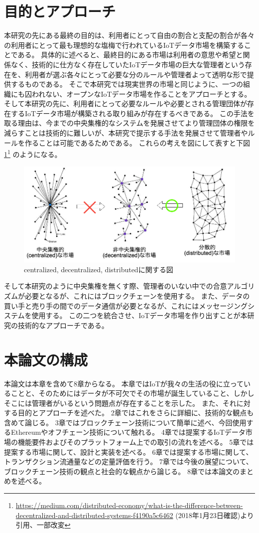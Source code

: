 \section{目的とアプローチ}
本研究の先にある最終の目的は、利用者にとって自由の割合と支配の割合が各々の利用者にとって最も理想的な塩梅で行われているIoTデータ市場を構築することである。
具体的に述べると、最終目的にある市場は利用者の意思や希望と関係なく、技術的に仕方なく存在していたIoTデータ市場の巨大な管理者という存在を、利用者が選ぶ各々にとって必要な分のルールや管理者よって透明な形で提供するものである。
そこで本研究では現実世界の市場と同じように、一つの組織にも囚われない、オープンなIoTデータ市場を作ることをアプローチとする。
そして本研究の先に、利用者にとって必要なルールや必要とされる管理団体が存在するIoTデータ市場が構築される取り組みが存在するべきである。
この手法を取る理由は、今までの中央集権的なシステムを発展させてより管理団体の権限を減らすことは技術的に難しいが、本研究で提示する手法を発展させて管理者やルールを作ることは可能であるためである。
これらの考えを図にして表すと下図\ref{distributed}\footnote{\url{https://medium.com/distributed-economy/what-is-the-difference-between-decentralized-and-distributed-systems-f4190a5c6462} (2018年1月23日確認)より引用、一部改変} のようになる。
\begin{figure}[htbp]
 \centering
  \includegraphics[width=140mm]{image/CentralizedDistributed.png}
 \caption{centralized, decentralized, distributedに関する図}
 \label{distributed}
\end{figure}
そして本研究のように中央集権を無くす際、管理者のいない中での合意アルゴリズムが必要となるが、これにはブロックチェーンを使用する。
また、データの買い手と売り手の間でのデータ通信が必要となるが、これにはメッセージングシステムを使用する。
この二つを統合させ、IoTデータ市場を作り出すことが本研究の技術的なアプローチである。

\section{本論文の構成}
本論文は本章を含めて8章からなる。
本章ではIoTが我々の生活の役に立っていることと、そのためにはデータが不可欠でその市場が誕生していること、しかしそこには管理者がいるという問題点が存在することを示した。
また、それに対する目的とアプローチを述べた。
2章ではこれをさらに詳細に、技術的な観点も含めて論じる。
3章ではブロックチェーン技術について簡単に述べ、今回使用するEthereumやオフチェーン技術について触れる。
4章では提案するIoTデータ市場の機能要件およびそのプラットフォーム上での取引の流れを述べる。
5章では提案する市場に関して、設計と実装を述べる。
6章では提案する市場に関して、トランザクション流通量などの定量評価を行う。
7章では今後の展望について、ブロックチェーン技術の観点と社会的な観点から論じる。
8章では本論文のまとめを述べる。
